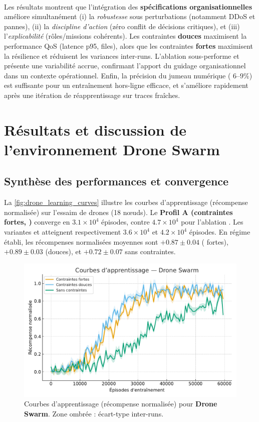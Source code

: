 \

Les résultats montrent que l’intégration des \textbf{spécifications organisationnelles} améliore simultanément (i) la \emph{robustesse} sous perturbations (notamment DDoS et pannes), (ii) la \emph{discipline d’action} (zéro conflit de décisions critiques), et (iii) l’\emph{explicabilité} (rôles/missions cohérents).
Les contraintes \textbf{douces} maximisent la performance QoS (latence p95, files), alors que les contraintes \textbf{fortes} maximisent la résilience et réduisent les variances inter-runs.
L’ablation \texttt{} sous-performe et présente une variabilité accrue, confirmant l’apport du guidage organisationnel dans un contexte opérationnel.
Enfin, la précision du jumeau numérique ( $6$--$9\%$) est suffisante pour un entraînement hors-ligne efficace, et s’améliore rapidement après une itération de réapprentissage sur traces fraîches.


\section{Résultats et discussion de l'environnement \textbf{Drone Swarm}}\label{sec:results_and_discussion_drone_swarm}

\subsection*{Synthèse des performances et convergence}

La \autoref{fig:drone_learning_curves} illustre les courbes d’apprentissage (récompense normalisée) sur l’essaim de drones (18 nœuds).
Le \textbf{Profil A (contraintes fortes, )} converge en $3.1\times 10^4$ épisodes, contre $4.7\times 10^4$ pour l’ablation \texttt{}.
Les variantes  et  atteignent respectivement $3.6\times 10^4$ et $4.2\times 10^4$ épisodes.
En régime établi, les récompenses normalisées moyennes sont $+0.87 \pm 0.04$ ( fortes), $+0.89 \pm 0.03$ (douces), et $+0.72 \pm 0.07$ sans contraintes.

\begin{figure}[h!]
  \centering
  \includegraphics[width=0.75\linewidth]{figures/results_drone_learning.pdf}
  \caption[Courbes d’apprentissage (récompense normalisée) pour \textbf{Drone Swarm}]{Courbes d’apprentissage (récompense normalisée) pour \textbf{Drone Swarm}. Zone ombrée : écart-type inter-runs.}
  \label{fig:drone_learning_curves}
\end{figure}

